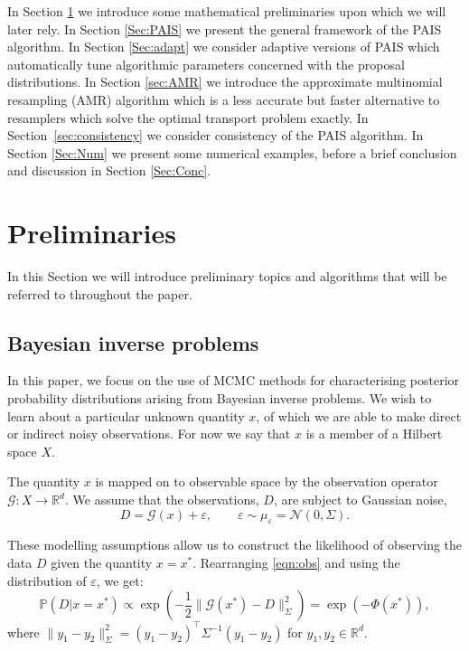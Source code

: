 \documentclass[final]{siamltex}
\newcommand{\data}{D}
\begin{document}
In Section \ref{Sec:Prelim} we introduce some mathematical
preliminaries upon which we will later rely. In Section \ref{Sec:PAIS}
we present the general framework of the PAIS algorithm. In Section
\ref{Sec:adapt} we consider adaptive versions of PAIS which
automatically tune algorithmic parameters concerned with the proposal
distributions. In Section \ref{sec:AMR} we introduce the approximate
multinomial resampling (AMR) algorithm which is a less accurate but
faster alternative to resamplers which solve the optimal transport
problem exactly. In Section~\ref{sec:consistency} we consider
consistency of the PAIS algorithm. In Section \ref{Sec:Num} we present
some numerical examples, before a brief conclusion and discussion in
Section \ref{Sec:Conc}.


\section{Preliminaries}\label{Sec:Prelim}

In this Section we will introduce preliminary topics and algorithms
that will be referred to throughout the paper.


\subsection{Bayesian inverse problems}

In this paper, we focus on the use of MCMC methods for characterising
posterior probability distributions arising from Bayesian inverse problems. We
wish to learn about a particular unknown quantity $x$, of which we are
able to make direct or indirect noisy observations. For now
we say that $x$ is a member of a Hilbert
space $X$. 

The quantity $x$ is mapped on to observable space by the observation
operator $\mathcal{G}:X \to\mathbb{R}^d$. We assume that the
observations, $\data$, are subject to Gaussian noise,
\begin{equation}\label{eqn:obs}
	\data = \mathcal{G}(x) + \varepsilon, \qquad \varepsilon \sim \mu_{\varepsilon} = \mathcal{N}(0,\Sigma).
\end{equation}

These modelling assumptions allow us to construct the 
likelihood of observing the data $\data$ given the quantity $x =
x^*$. Rearranging \eqref{eqn:obs} and using the distribution of
$\varepsilon$, we get:
\begin{equation}\label{eqn:like}
	\mathbb{P}(\data|x=x^*) \propto \exp \left ( -\frac{1}{2} \|\mathcal{G}(x^*)
	  - \data\|_\Sigma^2 \right ) = \exp\left(-\Phi(x^*)\right),
\end{equation}
where $\| y_1 - y_2 \|^2_\Sigma = (y_1-y_2)^\top\Sigma^{-1}(y_1-y_2)$
for $y_1,y_2 \in \mathbb{R}^d$.
\end{document}
